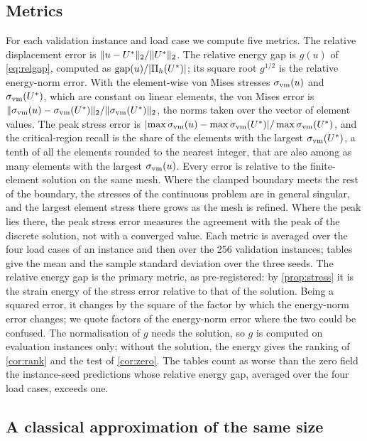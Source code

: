 \subsection{Metrics}\label{sec:methods:metrics}

For each validation instance and load case we compute five metrics. The relative
displacement error is $\lVert u-U^{\ast}\rVert_2/\lVert U^{\ast}\rVert_2$. The relative energy gap is $g(u)$
of \eqref{eq:relgap}, computed as $\operatorname{gap}(u)/\lvert\Pi_h(U^{\ast})\rvert$; its square root
$g^{1/2}$ is the relative energy-norm error. With the element-wise von Mises stresses
$\sigma_{\mathrm{vm}}(u)$ and $\sigma_{\mathrm{vm}}(U^{\ast})$, which are constant on linear elements, the von Mises error is
$\lVert \sigma_{\mathrm{vm}}(u)-\sigma_{\mathrm{vm}}(U^{\ast})\rVert_2/\lVert \sigma_{\mathrm{vm}}(U^{\ast})\rVert_2$, the norms taken over the vector of element values. The peak stress error is
$\lvert\max\sigma_{\mathrm{vm}}(u)-\max\sigma_{\mathrm{vm}}(U^{\ast})\rvert/\max\sigma_{\mathrm{vm}}(U^{\ast})$, and the critical-region recall is
the share of the elements with the largest $\sigma_{\mathrm{vm}}(U^{\ast})$, a tenth of all the elements
rounded to the nearest integer, that are also among as many elements with the largest
$\sigma_{\mathrm{vm}}(u)$. Every error is relative to the finite-element solution on the same mesh. Where
the clamped boundary meets the rest of the boundary, the stresses of the continuous problem
are in general singular, and the largest element stress there grows as the mesh is refined. Where the peak lies there, the peak stress error measures the agreement with the peak of the
discrete solution, not with a converged value. Each metric is averaged over the four load
cases of an instance and then over
the 256 validation instances; tables give the mean and the sample standard deviation over
the three seeds. The relative energy gap is the primary metric, as pre-registered: by
\cref{prop:stress} it is the strain energy of the stress error relative to that of the
solution. Being a squared error, it changes by the square of the factor by which the
energy-norm error changes; we quote factors of the energy-norm error where the two could be
confused. The normalisation of $g$ needs the solution, so $g$ is computed on evaluation
instances only; without the solution, the energy gives the ranking of \cref{cor:rank} and
the test of \cref{cor:zero}. The tables count as worse than the zero field the instance-seed
predictions whose relative energy gap, averaged over the four load cases, exceeds one.

\subsection{A classical approximation of the same size}\label{sec:methods:ritz}

